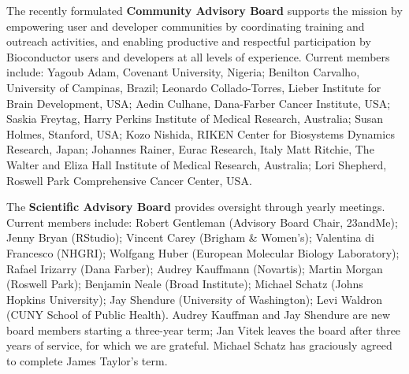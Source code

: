 \documentclass[letterpaper]{article}
\begin{document}
The recently formulated \textbf{Community Advisory Board} supports the
\Bioconductor{} mission by empowering user and developer communities
by coordinating training and outreach activities, and enabling
productive and respectful participation by Bioconductor users and
developers at all levels of experience. Current members include:
Yagoub Adam, Covenant University, Nigeria; Benilton Carvalho,
University of Campinas, Brazil; Leonardo Collado-Torres, Lieber
Institute for Brain Development, USA; Aedin Culhane, Dana-Farber
Cancer Institute, USA; Saskia Freytag, Harry Perkins Institute of
Medical Research, Australia; Susan Holmes, Stanford, USA; Kozo
Nishida, RIKEN Center for Biosystems Dynamics Research, Japan;
Johannes Rainer, Eurac Research, Italy Matt Ritchie, The Walter and
Eliza Hall Institute of Medical Research, Australia; Lori Shepherd,
Roswell Park Comprehensive Cancer Center, USA.

The \textbf{Scientific Advisory Board} provides oversight through
yearly meetings. Current members include: Robert Gentleman (Advisory
Board Chair, 23andMe); Jenny Bryan (RStudio); Vincent Carey (Brigham
\& Women’s); Valentina di Francesco (NHGRI); Wolfgang Huber (European
Molecular Biology Laboratory); Rafael Irizarry (Dana Farber); Audrey
Kauffmann (Novartis); Martin Morgan (Roswell Park); Benjamin Neale
(Broad Institute); Michael Schatz (Johns Hopkins University); Jay
Shendure (University of Washington); Levi Waldron (CUNY School of
Public Health). Audrey Kauffman and Jay Shendure are new board members
starting a three-year term; Jan Vitek leaves the board after three
years of service, for which we are grateful. Michael Schatz has
graciously agreed to complete James Taylor's term.
\end{document}
